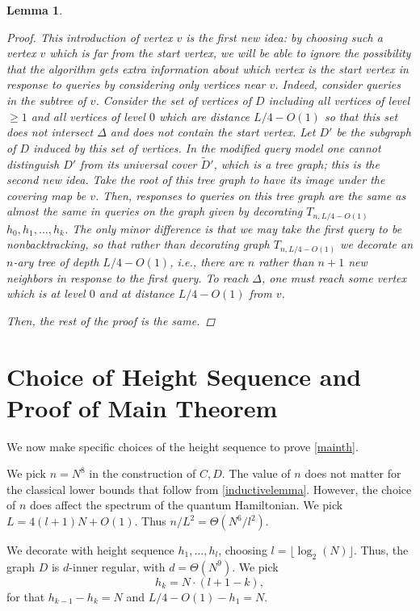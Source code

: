 \documentclass[letterpaper,onecolumn]{quantumarticle}
\newtheorem{lemma}{Lemma}
\newcommand{\glen}{L}
\begin{document}
\begin{lemma}
\begin{proof}
This introduction of vertex $v$ is the first new idea: by choosing such a vertex $v$ which is far from the start vertex, we will be able to ignore the possibility that the algorithm gets extra information about which vertex is the start vertex in response to queries by considering
only vertices near $v$.
Indeed, consider queries in the subtree of $v$.
Consider the set of vertices of $D$ including all vertices of level $\geq 1$ and all vertices of level $0$ which are
distance $\glen/4-O(1)$ so that this set does not intersect $\Delta$ and does not contain the start vertex.
Let $D'$ be the subgraph of $D$ induced by this set of vertices.
In the modified query model one cannot distinguish $D'$ from its universal cover $\tilde D'$, which is a tree graph; this is the second new idea.
Take the root of this tree graph to have its image under the covering map be $v$.
Then, responses to queries on this tree graph are the same as almost the same in queries on the graph given by decorating $T_{n,\glen/4-O(1)}$ 
$h_0,h_1,\ldots,h_k$.  The only minor difference is that we may take the first query to be nonbacktracking, so that rather than decorating graph $T_{n,\glen/4-O(1)}$ we decorate an $n$-ary tree of depth $\glen/4-O(1)$, i.e., there are $n$ rather than $n+1$ new neighbors in response to the first query.
To reach $\Delta$, one must reach some vertex which is at level $0$ and at distance $\glen/4-O(1)$ from $v$.

Then, the rest of the proof is the same.
\end{proof}
\end{lemma}


\section{Choice of Height Sequence and Proof of Main Theorem}
\label{chs}
We now make specific choices of the height sequence to prove \cref{mainth}.


We pick $n=N^8$ in the construction of $C,D$.  The value of $n$ does not matter for the classical lower bounds that follow from \cref{inductivelemma}.  However, the choice of $n$ does affect the spectrum of the quantum Hamiltonian.
We pick $\glen=4(l+1) N+O(1)$.
Thus $n/\glen^2=\Theta(N^6/l^2)$.

We decorate with height sequence $h_1,\ldots,h_l$, choosing $l=\lfloor \log_2(N)\rfloor $.
Thus, the graph $D$ is $d$-inner regular, with $d=\Theta(N^9)$.
We pick $$h_k=N \cdot (l+1-k),$$
for that $h_{k-1}-h_k=N$ and $L/4-O(1)-h_1=N$.
\end{document}
